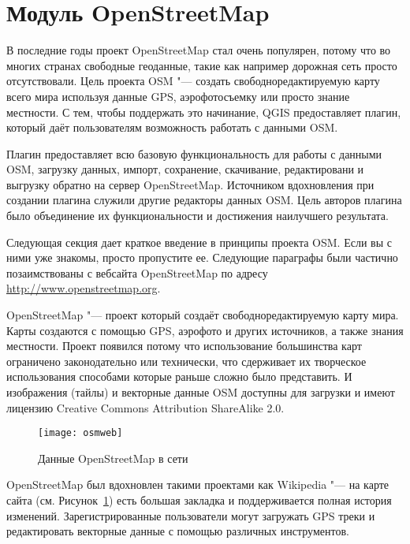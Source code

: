 
\section{Модуль OpenStreetMap}\label{plugins_osm}


В последние годы проект OpenStreetMap стал очень популярен, потому что
во многих странах свободные геоданные, такие как например дорожная сеть
просто отсутствовали. Цель проекта OSM "--- создать свободноредактируемую
карту всего мира используя данные GPS, аэрофотосъемку или просто знание
местности. С тем, чтобы поддержать это начинание, QGIS предоставляет
плагин, который даёт пользователям возможность работать с данными OSM.

Плагин предоставляет всю базовую функциональность для работы с данными
OSM, загрузку данных, импорт, сохранение, скачивание, редактировани и
выгрузку обратно на сервер OpenStreetMap. Источником вдохновления при
создании плагина служили другие редакторы данных OSM. Цель авторов
плагина было объединение их функциональности и достижения наилучшего
результата.

Следующая секция дает краткое введение в принципы проекта OSM. Если вы
с ними уже знакомы, просто пропустите ее. Следующие параграфы были
частично позаимствованы с вебсайта OpenStreetMap по адресу
\url{http://www.openstreetmap.org}.


OpenStreetMap "--- проект который создаёт свободноредактируемую карту
мира. Карты создаются с помощью GPS, аэрофото и других источников, а
также знания местности. Проект появился потому что использование
большинства карт ограничено законодательно или технически, что
сдерживает их творческое использования способами которые раньше сложно
было представить. И изображения (тайлы) и векторные данные OSM доступны
для загрузки и имеют лицензию Creative Commons Attribution ShareAlike 2.0.

\begin{figure}[ht]
   \centering
   \texttt{[image: osmweb]}
   \caption{Данные OpenStreetMap в сети \wincaption}\label{fig:osmweb}
\end{figure}

OpenStreetMap был вдохновлен такими проектами как Wikipedia "--- на карте
сайта (см. Рисунок~\ref{fig:osmweb}) есть большая закладка
 и поддерживается полная история изменений.
Зарегистрированные пользователи могут загружать GPS треки и редактировать
векторные данные с помощью различных инструментов.

